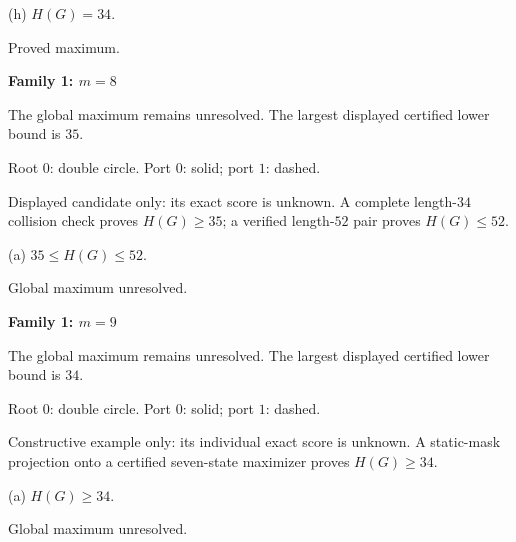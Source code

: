 \documentclass[10pt,a4paper]{article}
\begin{document}
\begin{minipage}[t]{.48\textwidth}\centering
\resizebox{8.2cm}{!}{}\par
{\footnotesize (h) $H(G)=34$.\par Proved maximum.}\par
\end{minipage}\hfill
\par\vspace{2.5mm}
\clearpage
{\Large\bfseries Family 1: $m=8$}\par
\vspace{2mm}
{\small The global maximum remains unresolved. The largest displayed certified lower bound is $35$.}\par
\vspace{1mm}
{\small Root $0$: double circle. Port $0$: solid; port $1$: dashed.}\par
\vspace{3mm}
{\small Displayed candidate only: its exact score is unknown. A complete length-$34$ collision check proves $H(G)\ge35$; a verified length-$52$ pair proves $H(G)\le52$.}\par\vspace{2mm}
\noindent\hfill
\begin{minipage}[t]{.96\textwidth}\centering
\resizebox{9cm}{!}{}\par
{\footnotesize (a) $35\le H(G)\le 52$.\par Global maximum unresolved.}\par
\end{minipage}\hfill
\par\vspace{2.5mm}
\clearpage
{\Large\bfseries Family 1: $m=9$}\par
\vspace{2mm}
{\small The global maximum remains unresolved. The largest displayed certified lower bound is $34$.}\par
\vspace{1mm}
{\small Root $0$: double circle. Port $0$: solid; port $1$: dashed.}\par
\vspace{3mm}
{\small Constructive example only: its individual exact score is unknown. A static-mask projection onto a certified seven-state maximizer proves $H(G)\ge34$.}\par\vspace{2mm}
\noindent\hfill
\begin{minipage}[t]{.96\textwidth}\centering
\resizebox{9cm}{!}{}\par
{\footnotesize (a) $H(G)\ge 34$.\par Global maximum unresolved.}\par
\end{minipage}\hfill
\end{document}
